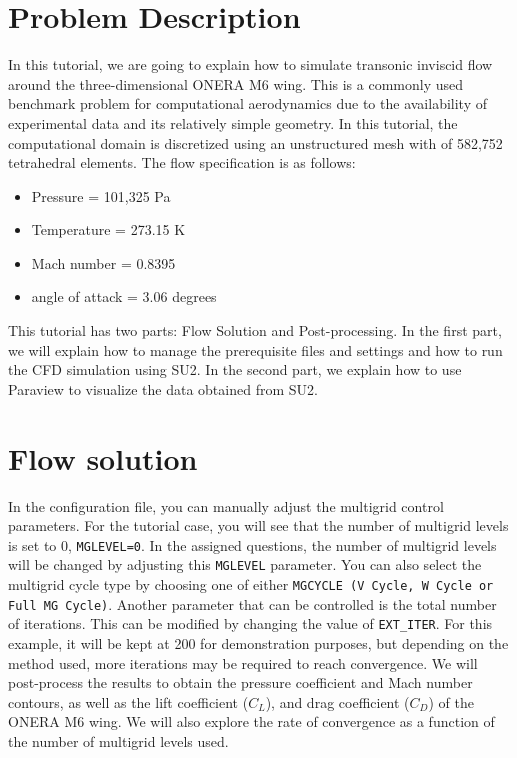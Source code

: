 \section*{Problem Description}
In this tutorial, we are going to explain how to simulate transonic inviscid flow around the three-dimensional ONERA M6 wing. This is a commonly used benchmark problem for computational aerodynamics due to the availability of experimental data and its relatively simple geometry. In this tutorial, the computational domain is discretized using an unstructured mesh with of 582,752 tetrahedral elements. The flow specification is as follows:
\begin{itemize}
    \item Pressure = 101,325 Pa
    \item Temperature = 273.15 K
    \item Mach number = 0.8395
    \item angle of attack = 3.06 degrees
\end{itemize}

This tutorial has two parts: Flow Solution and Post-processing. In the first part, we will explain how to manage the prerequisite files and settings and how to run the CFD simulation using SU2. In the second part, we explain how to use Paraview to visualize the data obtained from SU2.
\section*{Flow solution}
In the configuration file, you can manually adjust the multigrid control parameters. For the tutorial case, you will see that the number of multigrid levels is set to 0, \texttt{MGLEVEL=0}. In the assigned questions, the number of multigrid levels will be changed by adjusting this \texttt{MGLEVEL} parameter. You can also select the multigrid cycle type by choosing one of either \texttt{MGCYCLE (V Cycle, W Cycle or Full MG Cycle)}. Another parameter that can be controlled is the total number of iterations. This can be modified by changing the value of \texttt{EXT\_ITER}. For this example, it will be kept at 200 for demonstration purposes, but depending on the method used, more iterations may be required to reach convergence. We will post-process the results to obtain the pressure coefficient and Mach number contours, as well as the lift coefficient ($C_L$), and drag coefficient ($C_D$) of the ONERA M6 wing. We will also explore the rate of convergence as a function of the number of multigrid levels used.

